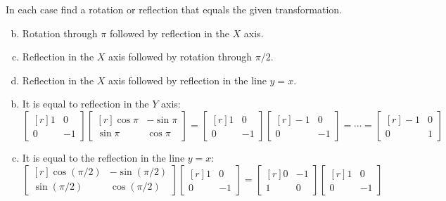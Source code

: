 \documentclass[../main.tex]{subfiles}
\begin{document}
In each case find a rotation or reflection that equals the given transformation.
\begin{enumerate}[a)]
	\setcounter{enumi}{1}
	\item Rotation through $\pi$ followed by reflection in the $X$ axis.
	\setcounter{enumi}{3}
	\item Reflection in the $X$ axis followed by rotation through $\pi/2$.
	\setcounter{enumi}{5}
	\item Reflection in the $X$ axis followed by reflection in the line $y = x$.
\end{enumerate}

\solution
\begin{enumerate}[a)]
	\setcounter{enumi}{1}
	\item It is equal to reflection in the $Y$ axis:
		\[
			\begin{bmatrix*}[r]1&0\\0&-1\end{bmatrix*}
			\begin{bmatrix*}[r]
				\cos{\pi} & -\sin{\pi} \\
				\sin{\pi} & \cos{\pi}
			\end{bmatrix*}
			=
			\begin{bmatrix*}[r]1&0\\0&-1\end{bmatrix*}
			\begin{bmatrix*}[r]
				-1 & 0 \\
				0 & -1
			\end{bmatrix*}
			=
			\cdots
			=
			\begin{bmatrix*}[r]
				-1 & 0 \\
				0 & 1
			\end{bmatrix*}
		\]
	\setcounter{enumi}{3}
	\item It is equal to the reflection in the line $y = x$:
		\[
			\begin{bmatrix*}[r]
				\cos{(\pi/2)} & -\sin{(\pi/2)} \\
				\sin{(\pi/2)} & \cos{(\pi/2)}
			\end{bmatrix*}
			\begin{bmatrix*}[r]1&0\\0&-1\end{bmatrix*}
			=
			\begin{bmatrix*}[r]
				0 & -1 \\
				1 & 0
			\end{bmatrix*}
			\begin{bmatrix*}[r]1&0\\0&-1\end{bmatrix*}
\]
\end{enumerate}
\end{document}
